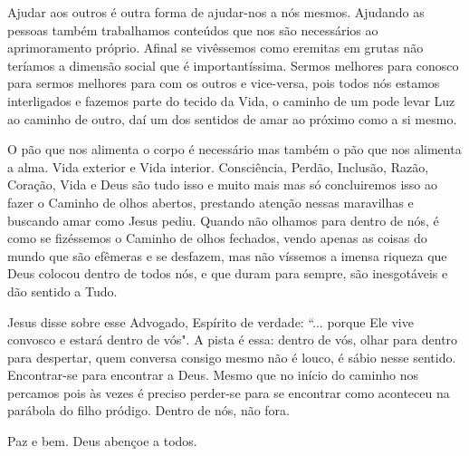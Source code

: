 \emdash{}Ajudar aos outros é outra forma de ajudar-nos a nós mesmos. Ajudando as pessoas também trabalhamos conteúdos que nos são necessários ao aprimoramento próprio. Afinal se vivêssemos como eremitas em grutas não teríamos a dimensão social que é importantíssima. Sermos melhores para conosco para sermos melhores para com os outros e vice-versa, pois todos nós estamos interligados e fazemos parte do tecido da Vida, o caminho de um pode levar Luz ao caminho de outro, daí um dos sentidos de amar ao próximo como a si mesmo.

\emdash{}O pão que nos alimenta o corpo é necessário mas também o pão que nos alimenta a alma. Vida exterior e Vida interior. Consciência, Perdão, Inclusão, Razão, Coração, Vida e Deus são tudo isso e muito mais mas só concluiremos isso ao fazer o Caminho de olhos abertos, prestando atenção nessas maravilhas e buscando amar como Jesus pediu. Quando não olhamos para dentro de nós, é como se fizéssemos o Caminho de olhos fechados, vendo apenas as coisas do mundo que são efêmeras e se desfazem, mas não víssemos a imensa riqueza que Deus colocou dentro de todos nós, e que duram para sempre, são inesgotáveis e dão sentido a Tudo.

\emdash{}Jesus disse sobre esse Advogado, Espírito de verdade: ``... porque Ele vive convosco e estará dentro de vós". A pista é essa: dentro de vós, olhar para dentro para despertar, quem conversa consigo mesmo não é louco, é sábio nesse sentido. Encontrar-se para encontrar a Deus. Mesmo que no início do caminho nos percamos pois às vezes é preciso perder-se para se encontrar como aconteceu na parábola do filho pródigo. Dentro de nós, não fora.

\emdash{}Paz e bem. Deus abençoe a todos.